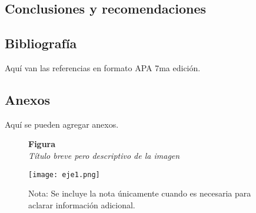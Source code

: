 \documentclass[12pt,letterpaper]{report}
\begin{document}
	\newpage
	\begin{center}
	\section{Conclusiones y recomendaciones}
	\end{center}
	
	\newpage
	\begin{center}
	\section*{Bibliografía}
	\end{center}
	Aquí van las referencias en formato APA 7ma edición.
	
	\newpage
	\begin{center}
	\section*{Anexos}
	\end{center}
	Aquí se pueden agregar anexos.
	
	\begin{figure}[ht]
		
		\textbf{Figura \thefigure}\\[0.5em]
		\textit{Título breve pero descriptivo de la imagen}\\[1em]
		\begin{center}
			
			\texttt{[image: eje1.png]}\\[1em]
		\end{center}
		
		
		\normalsize Nota: Se incluye la nota únicamente cuando es necesaria para aclarar información adicional.
		
	\end{figure}
	
\end{document}
